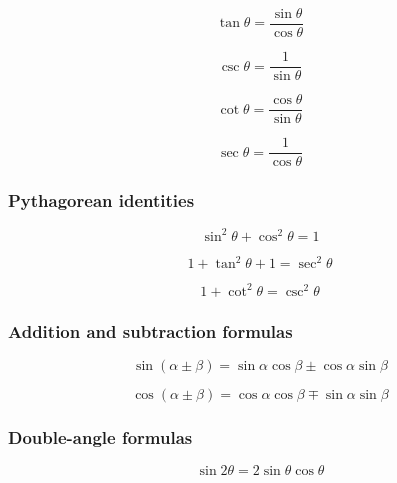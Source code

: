 \documentclass{book}
\begin{document}
\begin{equation}
	\tan \theta = \frac{\sin\theta}{\cos \theta}
\end{equation}

\begin{equation} 
	\csc \theta = \frac{1}{\sin \theta}
\end{equation}

\begin{equation} 
	\cot \theta = \frac{\cos \theta}{\sin \theta}
\end{equation}

\begin{equation} 
	\sec \theta = \frac{1}{\cos \theta}
\end{equation}

\subsubsection{Pythagorean identities}

\begin{equation}
	\sin^2 \theta + \cos^2 \theta = 1
\end{equation}

\begin{equation}
	1 + \tan^2 \theta + 1 = \sec^2 \theta
\end{equation}

\begin{equation}
	1 + \cot^2 \theta = \csc^2 \theta
\end{equation}

\subsubsection{Addition and subtraction formulas}
\begin{equation} 
	\sin(\alpha \pm \beta) = \sin \alpha \cos \beta \pm \cos \alpha \sin \beta
\end{equation}

\begin{equation} 
	\cos(\alpha \pm \beta) = \cos \alpha \cos \beta \mp \sin \alpha \sin \beta
\end{equation}

\subsubsection{Double-angle formulas}
\begin{equation}
	\sin 2\theta = 2 \sin \theta \cos \theta
\end{equation}
\end{document}
